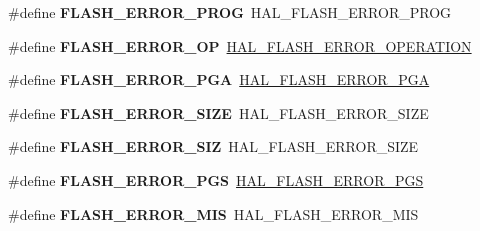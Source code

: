 \begin{DoxyCompactItemize}
\#define {\bfseries F\+L\+A\+S\+H\+\_\+\+E\+R\+R\+O\+R\+\_\+\+P\+R\+OG}~H\+A\+L\+\_\+\+F\+L\+A\+S\+H\+\_\+\+E\+R\+R\+O\+R\+\_\+\+P\+R\+OG
\item 
\mbox{\label{group___h_a_l___f_l_a_s_h___aliased___defines_ga7e6bf51847569d433bdb694bdb5ac0f7}} 
\#define {\bfseries F\+L\+A\+S\+H\+\_\+\+E\+R\+R\+O\+R\+\_\+\+OP}~\hyperlink{group___f_l_a_s_h___error___code_gafa1433e0ca2366478928c04244310d44}{H\+A\+L\+\_\+\+F\+L\+A\+S\+H\+\_\+\+E\+R\+R\+O\+R\+\_\+\+O\+P\+E\+R\+A\+T\+I\+ON}
\item 
\mbox{\label{group___h_a_l___f_l_a_s_h___aliased___defines_ga3e610cf7bc499ea0e7eee1380a04f42d}} 
\#define {\bfseries F\+L\+A\+S\+H\+\_\+\+E\+R\+R\+O\+R\+\_\+\+P\+GA}~\hyperlink{group___f_l_a_s_h___error___code_gad9f62b6567543610f667bce580550662}{H\+A\+L\+\_\+\+F\+L\+A\+S\+H\+\_\+\+E\+R\+R\+O\+R\+\_\+\+P\+GA}
\item 
\mbox{\label{group___h_a_l___f_l_a_s_h___aliased___defines_gac056ad0617d3beaf8cf2ffb0c87b7266}} 
\#define {\bfseries F\+L\+A\+S\+H\+\_\+\+E\+R\+R\+O\+R\+\_\+\+S\+I\+ZE}~H\+A\+L\+\_\+\+F\+L\+A\+S\+H\+\_\+\+E\+R\+R\+O\+R\+\_\+\+S\+I\+ZE
\item 
\mbox{\label{group___h_a_l___f_l_a_s_h___aliased___defines_gaaa959c347779d59952fcb60d15dbe2b0}} 
\#define {\bfseries F\+L\+A\+S\+H\+\_\+\+E\+R\+R\+O\+R\+\_\+\+S\+IZ}~H\+A\+L\+\_\+\+F\+L\+A\+S\+H\+\_\+\+E\+R\+R\+O\+R\+\_\+\+S\+I\+ZE
\item 
\mbox{\label{group___h_a_l___f_l_a_s_h___aliased___defines_ga578b6dd558f1d11d9791b3c63a61e14b}} 
\#define {\bfseries F\+L\+A\+S\+H\+\_\+\+E\+R\+R\+O\+R\+\_\+\+P\+GS}~\hyperlink{group___f_l_a_s_h___error___code_ga7132ff3b7f45c0cfe818d61bdb01dc64}{H\+A\+L\+\_\+\+F\+L\+A\+S\+H\+\_\+\+E\+R\+R\+O\+R\+\_\+\+P\+GS}
\item 
\mbox{\label{group___h_a_l___f_l_a_s_h___aliased___defines_ga10229d78c25e0d944031910606462be1}} 
\#define {\bfseries F\+L\+A\+S\+H\+\_\+\+E\+R\+R\+O\+R\+\_\+\+M\+IS}~H\+A\+L\+\_\+\+F\+L\+A\+S\+H\+\_\+\+E\+R\+R\+O\+R\+\_\+\+M\+IS

\end{DoxyCompactItemize}
